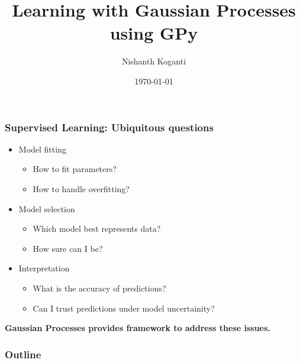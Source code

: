\documentclass[10pt]{beamer}
\title{Learning with Gaussian Processes using GPy}
\author{Nishanth Koganti}
\date{\today}
\begin{document}
  \begin{frame}[noframenumbering]
    \titlepage
  \end{frame}

  \begin{frame}
    \frametitle{Supervised Learning: Ubiquitous questions}

    \begin{itemize}
      \item Model fitting
      \begin{itemize}
        \item How to fit parameters?
        \item How to handle overfitting?
      \end{itemize}

      \item Model selection
      \begin{itemize}
        \item Which model best represents data?
        \item How sure can I be?
      \end{itemize}

      \item Interpretation
      \begin{itemize}
        \item What is the accuracy of predictions?
        \item Can I trust predictions under model uncertainity?
      \end{itemize}
    \end{itemize}

    \begin{center}
      \textbf{Gaussian Processes provides framework to address these issues.}
    \end{center}
  \end{frame}

  \begin{frame}[noframenumbering]
    \frametitle{Outline}
    \tableofcontents
  \end{frame}
\end{document}
